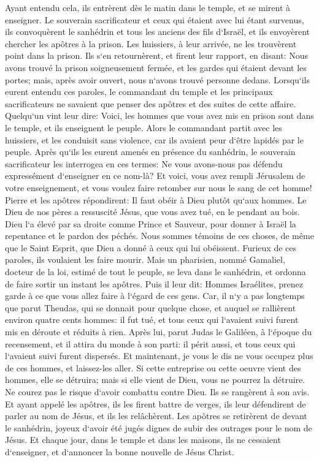 \verse Ayant entendu cela, ils entrèrent dès le matin dans le temple, et se mirent à enseigner. Le souverain sacrificateur et ceux qui étaient avec lui étant survenus, ils convoquèrent le sanhédrin et tous les anciens des fils d`Israël, et ils envoyèrent chercher les apôtres à la prison. 
\verse Les huissiers, à leur arrivée, ne les trouvèrent point dans la prison. Ils s`en retournèrent, et firent leur rapport, 
\verse en disant: Nous avons trouvé la prison soigneusement fermée, et les gardes qui étaient devant les portes; mais, après avoir ouvert, nous n`avons trouvé personne dedans. 
\verse Lorsqu`ils eurent entendu ces paroles, le commandant du temple et les principaux sacrificateurs ne savaient que penser des apôtres et des suites de cette affaire. 
\verse Quelqu`un vint leur dire: Voici, les hommes que vous avez mis en prison sont dans le temple, et ils enseignent le peuple. 
\verse Alors le commandant partit avec les huissiers, et les conduisit sans violence, car ils avaient peur d`être lapidés par le peuple. 
\verse Après qu`ils les eurent amenés en présence du sanhédrin, le souverain sacrificateur les interrogea en ces termes: 
\verse Ne vous avons-nous pas défendu expressément d`enseigner en ce nom-là? Et voici, vous avez rempli Jérusalem de votre enseignement, et vous voulez faire retomber sur nous le sang de cet homme! 
\verse Pierre et les apôtres répondirent: Il faut obéir à Dieu plutôt qu`aux hommes. 
\verse Le Dieu de nos pères a ressuscité Jésus, que vous avez tué, en le pendant au bois. 
\verse Dieu l`a élevé par sa droite comme Prince et Sauveur, pour donner à Israël la repentance et le pardon des péchés. 
\verse Nous sommes témoins de ces choses, de même que le Saint Esprit, que Dieu a donné à ceux qui lui obéissent. 
\verse Furieux de ces paroles, ils voulaient les faire mourir. 
\verse Mais un pharisien, nommé Gamaliel, docteur de la loi, estimé de tout le peuple, se leva dans le sanhédrin, et ordonna de faire sortir un instant les apôtres. 
\verse Puis il leur dit: Hommes Israélites, prenez garde à ce que vous allez faire à l`égard de ces gens. 
\verse Car, il n`y a pas longtemps que parut Theudas, qui se donnait pour quelque chose, et auquel se rallièrent environ quatre cents hommes: il fut tué, et tous ceux qui l`avaient suivi furent mis en déroute et réduits à rien. 
\verse Après lui, parut Judas le Galiléen, à l`époque du recensement, et il attira du monde à son parti: il périt aussi, et tous ceux qui l`avaient suivi furent dispersés. 
\verse Et maintenant, je vous le dis ne vous occupez plus de ces hommes, et laissez-les aller. Si cette entreprise ou cette oeuvre vient des hommes, elle se détruira; 
\verse mais si elle vient de Dieu, vous ne pourrez la détruire. Ne courez pas le risque d`avoir combattu contre Dieu. 
\verse Ils se rangèrent à son avis. Et ayant appelé les apôtres, ils les firent battre de verges, ils leur défendirent de parler au nom de Jésus, et ils les relâchèrent. 
\verse Les apôtres se retirèrent de devant le sanhédrin, joyeux d`avoir été jugés dignes de subir des outrages pour le nom de Jésus. 
\verse Et chaque jour, dans le temple et dans les maisons, ils ne cessaient d`enseigner, et d`annoncer la bonne nouvelle de Jésus Christ. 


